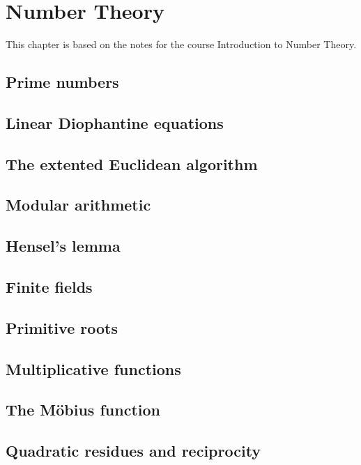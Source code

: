 \chapter{Number Theory}\label{cha:intr-numb-theory}
This chapter is based on the notes for the course Introduction to Number Theory.

\section{Prime numbers}

\section{Linear Diophantine equations}

\section{The extented Euclidean algorithm}

\section{Modular arithmetic}

\section{Hensel's lemma}

\section{Finite fields}

\section{Primitive roots}

\section{Multiplicative functions}

\section{The M\"obius function}

\section{Quadratic residues and reciprocity}

